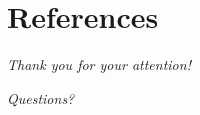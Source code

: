 \documentclass{beamer}
\begin{document}
\section*{References}
\begin{frame}[allowframebreaks]
	
%	
	
\end{frame}

\begin{frame}{}
	\centering \Huge
	\emph{Thank you for your attention!}
	
	\emph{Questions?}
\end{frame}
	
\end{document}
